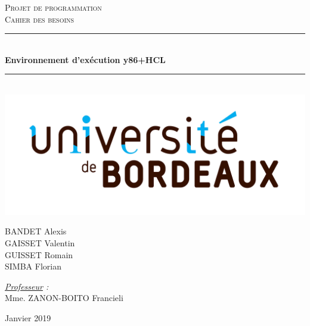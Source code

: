 \documentclass[french]{article}
\newcommand{\HRule}{\rule{\linewidth}{0.5mm}}
\begin{document}
\begin{titlepage}
  \begin{sffamily}
  \begin{center}

    \textsc{\LARGE Projet de programmation}\\[2cm]

    \textsc{\Large Cahier des besoins}\\[1.5cm]

    \HRule \\[0.4cm]
    { \huge \bfseries Environnement d'exécution y86+HCL\\[0.4cm] }

    \HRule \\[1cm]
    \includegraphics[scale=0.07]{img/logoUB.jpg}
    \\[2cm]

    \begin{minipage}{0.4\textwidth}
      \begin{flushleft} \large
        \textsc{BANDET} Alexis\\
        \textsc{GAISSET} Valentin\\
        \textsc{GUISSET} Romain\\
        \textsc{SIMBA} Florian\\
      \end{flushleft}
    \end{minipage}
    \begin{minipage}{0.4\textwidth}
      \begin{flushright} \large
        \emph{\underline{Professeur} :}\\ Mme. \textsc{ZANON-BOITO} Francieli\\
      \end{flushright}
    \end{minipage}

    \vfill

    {\large Janvier 2019}

  \end{center}
  \end{sffamily}
\end{titlepage}
\end{document}
